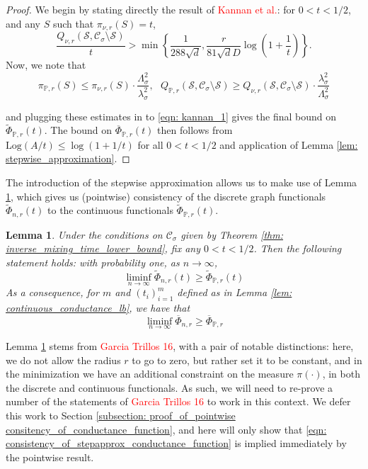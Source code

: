 \documentclass{article}
\newcommand{\1}{\mathbf{1}}
\newcommand{\Log}{\mathrm{Log}}
\newcommand{\Pbb}{\mathbb{P}}
\newcommand{\Sset}{\mathcal{S}}
\newcommand{\Cset}{\mathcal{C}}
\newcommand{\Csig}{\Cset_{\sigma}}
\theoremstyle{aldenthm}
\newtheorem{lemma}{Lemma}
\begin{document}
\begin{proof}
	We begin by stating directly the result of \textcolor{red}{Kannan et al.}: for $0 < t < 1/2$, and any $S$ such that $\pi_{\nu,r}(S) = t$,
	\begin{equation}
	\label{eqn: kannan_1}
	\frac{Q_{\nu,r}(\Sset, \Csig \setminus \Sset)}{t} > \min\left\{\frac{1}{288\sqrt{d}},\frac{r}{81 \sqrt{d}D}\log\left(1 + \frac{1}{t}\right)\right\}.
	\end{equation}
	Now, we note that
	\begin{equation*}
	\pi_{\Pbb,r}(S) \leq \pi_{\nu,r}(S) \cdot \frac{\Lambda_{\sigma}^2}{\lambda_{\sigma}^2}, ~~~ Q_{\Pbb,r}(\Sset, \Csig \setminus \Sset) \geq Q_{\nu,r}(\Sset, \Csig \setminus \Sset) \cdot \frac{\lambda_{\sigma}^2}{\Lambda_{\sigma}^2}
	\end{equation*}
	 
	and plugging these estimates in to \eqref{eqn: kannan_1} gives the final bound on $\widetilde{\Phi}_{\Pbb,r}(t)$.  The bound on $\overline{\Phi}_{\Pbb,r}(t)$ then follows from  $\Log(A/t) \leq \log(1 + 1/t)$ for all $0 < t < 1/2$ and application of Lemma \ref{lem: stepwise_approximation}.
\end{proof}

The introduction of the stepwise approximation allows us to make use of Lemma \ref{lem: consistency_of_conductance_function}, which gives us (pointwise) consistency of the discrete graph functionals $\widetilde{\Phi}_{n,r}(t)$ to the continuous functionals $\widetilde{\Phi}_{\Pbb,r}(t)$. 

\begin{lemma}
	\label{lem: consistency_of_conductance_function}
	Under the conditions on $\Csig$ given by Theorem \ref{thm: inverse_mixing_time_lower_bound}, fix any $0 < t < 1/2$. Then the following statement holds: with probability one, as $n \to \infty$,
	\begin{equation*}
	\liminf_{n \to \infty} \widetilde{\Phi}_{n,r}(t) \geq \widetilde{\Phi}_{\Pbb,r}(t)
	\end{equation*}
	As a consequence, for $m$ and $(t_i)_{i=1}^{m}$ defined as in Lemma \ref{lem: continuous_conductance_lb}, we have that
	\begin{equation}
	\label{eqn: consistency_of_stepapprox_conductance_function}
	\liminf_{n \to \infty} \overline{\Phi}_{n,r} \geq \overline{\Phi}_{\Pbb,r}
	\end{equation}
\end{lemma}
Lemma \ref{lem: consistency_of_conductance_function} stems from \textcolor{red}{Garcia Trillos 16}, with a pair of notable distinctions: here, we do not allow the radius $r$ to go to zero, but rather set it to be constant, and in the minimization we have an additional constraint on the measure $\pi(\cdot)$, in both the discrete and continuous functionals. As such, we will need to re-prove a number of the statements of \textcolor{red}{Garcia Trillos 16} to work in this context. We defer this work to Section \ref{subsection: proof_of_pointwise consitency_of_conductance_function}, and here will only show that  \eqref{eqn: consistency_of_stepapprox_conductance_function} is implied immediately by the pointwise result. 
\end{document}
